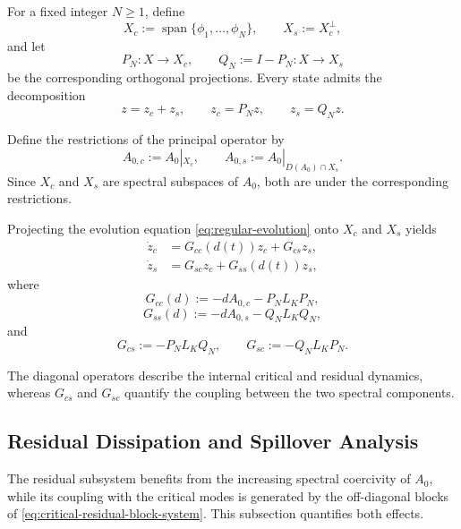 \documentclass[pdflatex,sn-mathphys-num]{sn-jnl}
\theoremstyle{thmstyleone}%
\theoremstyle{thmstyletwo}%
\theoremstyle{thmstylethree}%
\begin{document}
For a fixed integer \(N\ge1\), define
\begin{equation}
X_c
:=
\operatorname{span}\{\phi_1,\ldots,\phi_N\},
\qquad
X_s
:=
X_c^\perp,
\label{eq:critical-residual-spaces}
\end{equation}
and let
\[
P_N:X\rightarrow X_c,
\qquad
Q_N:=I-P_N:X\rightarrow X_s
\]
be the corresponding orthogonal projections. Every state admits the
decomposition
\[
z=z_c+z_s,
\qquad
z_c=P_Nz,
\qquad
z_s=Q_Nz.
\]

Define the restrictions of the principal operator by
\[
A_{0,c}
:=
A_0|_{X_c},
\qquad
A_{0,s}
:=
A_0|_{D(A_0)\cap X_s}.
\]
Since \(X_c\) and \(X_s\) are spectral subspaces of \(A_0\), both are under the corresponding restrictions.

Projecting the evolution equation
\eqref{eq:regular-evolution}
onto \(X_c\) and \(X_s\) yields
\begin{equation}
\begin{aligned}
\dot z_c
&=
G_{cc}(d(t))z_c
+
G_{cs}z_s,
\\
\dot z_s
&=
G_{sc}z_c
+
G_{ss}(d(t))z_s,
\end{aligned}
\label{eq:critical-residual-block-system}
\end{equation}
where
\begin{equation}
G_{cc}(d)
:=
-dA_{0,c}
-
P_NL_KP_N,
\label{eq:Gcc-definition}
\end{equation}
\begin{equation}
G_{ss}(d)
:=
-dA_{0,s}
-
Q_NL_KQ_N,
\label{eq:Gss-definition}
\end{equation}
and
\begin{equation}
G_{cs}
:=
-P_NL_KQ_N,
\qquad
G_{sc}
:=
-Q_NL_KP_N.
\label{eq:coupling-blocks}
\end{equation}

The diagonal operators describe the internal critical and residual
dynamics, whereas \(G_{cs}\) and \(G_{sc}\) quantify the coupling between the two spectral components.

\subsection{Residual Dissipation and Spillover Analysis}
\label{subsec:residual-analysis}

The residual subsystem benefits from the increasing spectral coercivity of \(A_0\), while its coupling with the critical modes is generated by the off-diagonal blocks of \eqref{eq:critical-residual-block-system}.
This subsection quantifies both effects.
\end{document}
